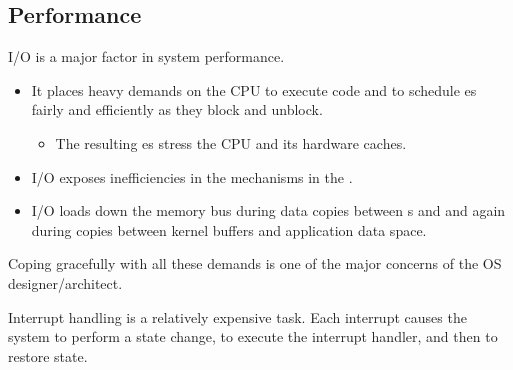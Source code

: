 \subsection{Performance}\label{subsec:IO_Subsystem_Performance}
I/O is a major factor in system performance.
\begin{itemize}[noitemsep]
\item It places heavy demands on the CPU to execute  code and to schedule es fairly and efficiently as they block and unblock.
  \begin{itemize}[noitemsep]
  \item The resulting es stress the CPU and its hardware caches.
\end{itemize}
\item I/O exposes inefficiencies in the  mechanisms in the .
\item I/O loads down the memory bus during data copies between s and  and again during copies between kernel buffers and application data space.
\end{itemize}

Coping gracefully with all these demands is one of the major concerns of the OS designer/architect.

Interrupt handling is a relatively expensive task.
Each interrupt causes the system to perform a state change, to execute the interrupt handler, and then to restore state.

